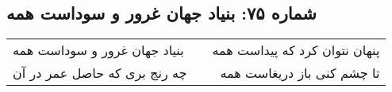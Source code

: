 \begin{center}
\section*{شماره ۷۵: بنیاد جهان غرور و سوداست همه}
\label{sec:075}
\begin{longtable}{l p{0.5cm} r}
بنیاد جهان غرور و سوداست همه
&&
پنهان نتوان کرد که پیداست همه
\\
چه رنج بری که حاصل عمر در آن
&&
تا چشم کنی باز دریغاست همه
\\
\end{longtable}
\end{center}

